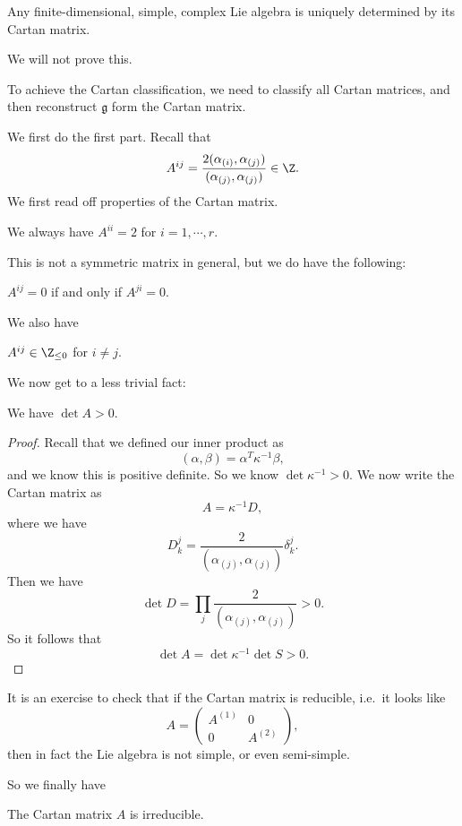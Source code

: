 \documentclass[a4paper]{article}
\begin{document}
\begin{thm}[Cartan]
  Any finite-dimensional, simple, complex Lie algebra is uniquely determined by its Cartan matrix.
\end{thm}

We will not prove this.

To achieve the Cartan classification, we need to classify all Cartan matrices, and then reconstruct $\mathfrak{g}$ form the Cartan matrix.

We first do the first part. Recall that
\[
  A^{ij} = \frac{2 (\alpha_{(i)}, \alpha_{(j)})}{(\alpha_{(j)}, \alpha_{(j)})} \in \Z.
\]
We first read off properties of the Cartan matrix.
\begin{prop}
  We always have $A^{ii} = 2$ for $i = 1, \cdots, r$.
\end{prop}

This is not a symmetric matrix in general, but we do have the following:
\begin{prop}
  $A^{ij} = 0$ if and only if $A^{ji} = 0$.
\end{prop}

We also have
\begin{prop}
  $A^{ij} \in \Z_{\leq 0}$ for $i \not= j$.
\end{prop}

We now get to a less trivial fact:
\begin{prop}
  We have $\det A > 0$.
\end{prop}

\begin{proof}
  Recall that we defined our inner product as
  \[
    (\alpha, \beta) = \alpha^T \kappa^{-1} \beta,
  \]
  and we know this is positive definite. So we know $\det \kappa^{-1} > 0$. We now write the Cartan matrix as
  \[
    A = \kappa^{-1}D,
  \]
  where we have
  \[
    D_k^j = \frac{2}{(\alpha_{(j)}, \alpha_{(j)})} \delta^j_k.
  \]
  Then we have
  \[
    \det D = \prod_j \frac{2}{(\alpha_{(j)}, \alpha_{(j)})} > 0.
  \]
  So it follows that
  \[
    \det A = \det \kappa^{-1} \det S > 0.
  \]
\end{proof}

It is an exercise to check that if the Cartan matrix is reducible, i.e.\ it looks like
\[
  A =
  \begin{pmatrix}
    A^{(1)} & 0\\
    0 & A^{(2)}
  \end{pmatrix},
\]
then in fact the Lie algebra is not simple, or even semi-simple.

So we finally have
\begin{prop}
  The Cartan matrix $A$ is irreducible.
\end{prop}
\end{document}
